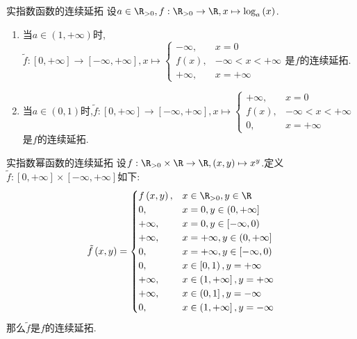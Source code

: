 \begin{proposition}{实指数函数的连续延拓}{}
	设$a\in\R_{>0},f:\R_{>0}\to\R,x\mapsto\log_{a}\left(x\right)$.
	\begin{enumerate}
		\item 当$a\in\left(1,+\infty\right)$时,$\tilde{f}:\left[0,+\infty\right]\to\left[-\infty,+\infty\right],x\mapsto
		\begin{cases}
			-\infty,&x=0\\
			f\left(x\right),&-\infty<x<+\infty\\
			+\infty,&x=+\infty
		\end{cases}$是$f$的连续延拓.
		\item 当$a\in\left(0,1\right)$时,$\tilde{f}:\left[0,+\infty\right]\to\left[-\infty,+\infty\right],x\mapsto
		\begin{cases}
			+\infty,&x=0\\
			f\left(x\right),&-\infty<x<+\infty\\
			0,&x=+\infty
		\end{cases}$是$f$的连续延拓.
	\end{enumerate}
\end{proposition}

\begin{proposition}{实指数幂函数的连续延拓}{}
	设$f:\R_{>0}\times\R\to\R,\left(x,y\right)\mapsto x^{y}$.定义$\tilde{f}:\left[0,+\infty\right]\times\left[-\infty,+\infty\right]$如下:
	\begin{align*}
		\tilde{f}\left(x,y\right)=
		\begin{cases}
			f\left(x,y\right),&x\in\R_{>0},y\in\R\\
			0,&x=0,y\in\left(0,+\infty\right]\\
			+\infty,&x=0,y\in\left[-\infty,0\right)\\
			+\infty,&x=+\infty,y\in\left(0,+\infty\right]\\
			0,&x=+\infty,y\in\left[-\infty,0\right)\\
			0,&x\in\left[0,1\right),y=+\infty\\
			+\infty,&x\in\left(1,+\infty\right],y=+\infty\\
			+\infty,&x\in\left(0,1\right],y=-\infty\\
			0,&x\in\left(1,+\infty\right],y=-\infty
		\end{cases}
	\end{align*}
	那么$\tilde{f}$是$f$的连续延拓.
\end{proposition}

